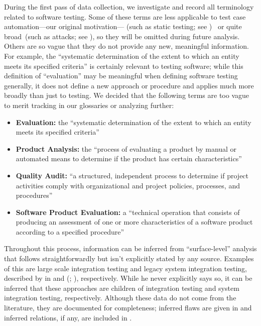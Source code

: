 During the first pass of data collection, we investigate and record all
terminology related to software testing. Some of these terms are less
applicable to test case automation---our original motivation---%
\ifnotpaper(such as static testing; see %
)\ \fi%
or quite broad\ifnotpaper\ (such as attacks; see %
    )\fi, so they will be omitted during future analysis.
\ifnotpaper
    Others are so vague that they do not provide any new, meaningful
    information. For example, the ``systematic determination of the extent to
    which an entity meets its specified criteria'' \citep[p.~167]{IEEE2017} is
    certainly relevant to testing software; while this definition of
    ``evaluation'' may be meaningful when defining software testing generally,
    it does not define a new approach or procedure and applies much more
    broadly than just to testing. We decided that the
    following terms are too vague to merit tracking in our glossaries or
    analyzing further:
    \begin{itemize}
        \item \textbf{Evaluation:} the ``systematic determination of the extent
              to which an entity meets its specified criteria''
              \citep[p.~167]{IEEE2017}
        \item \textbf{Product Analysis:} the ``process of evaluating a product by
              manual or automated means to determine if the product has certain
              characteristics'' \citep[p.~343]{IEEE2017}
        \item \textbf{Quality Audit:} ``a structured, independent process to
              determine if project activities comply with organizational and
              project policies, processes, and procedures'' \citep[p.~361]{IEEE2017}
        \item \textbf{Software Product Evaluation:} a ``technical operation that
              consists of producing an assessment of one or more characteristics
              of a software product according to a specified procedure''
              \citep[p.~424]{IEEE2017}
    \end{itemize}

    \label{infers}
    Throughout this process, information can be inferred from ``surface-level''
    analysis that follows straightforwardly but isn't explicitly stated by any
    source. Examples of this are large scale integration testing and legacy
    system integration testing, described by \citeauthor{Gerrard2000a} in
    \citeyearpar[p.~30]{Gerrard2000b} and (\citeyear[Tab.~2]{Gerrard2000a};
    \citeyear[Tab.~1]{Gerrard2000b}), respectively. While he never explicitly
    says so, it can be inferred that these approaches are children of
    integration testing and system integration testing, respectively.
    Although these data do not come from the literature, they are documented
    for completeness; inferred flaws are given in 
    and inferred relations, if any, are included in \recFigs{}.
\fi

